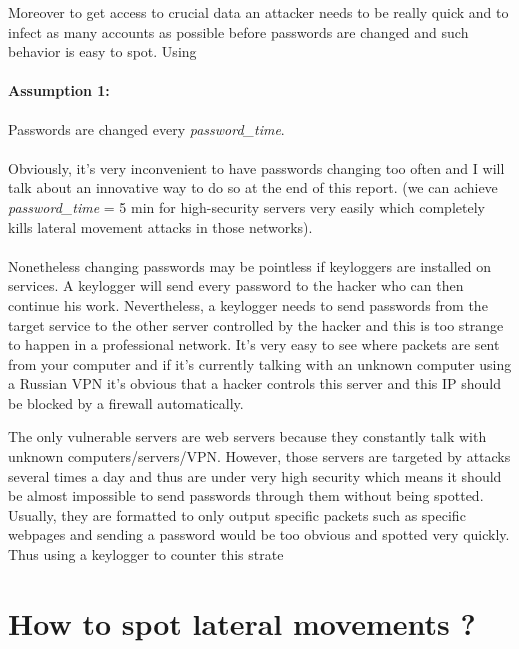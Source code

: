 \documentclass[11pt]{article}
\begin{document}
Moreover to get access to crucial data an attacker needs to be really quick and to infect as many accounts as possible before passwords are changed and such behavior is easy to spot. Using
\paragraph{Assumption 1:}
Passwords are changed every \textit{password\_time}.
\paragraph{}
Obviously, it's very inconvenient to have passwords changing too often and I will talk about an innovative way to do so at the end of this report. (we can achieve \textit{password\_time} = 5 min for high-security servers very easily which completely kills lateral movement attacks in those networks).\\
\paragraph{}
Nonetheless changing passwords may be pointless if keyloggers are installed on services. A keylogger will send every password to the hacker who can then continue his work. Nevertheless, a keylogger needs to send passwords from the target service to the other server controlled by the hacker and this is too strange to happen in a professional network. It's very easy to see where packets are sent from your computer and if it's currently talking with an unknown computer using a Russian VPN it's obvious that a hacker controls this server and this IP should be blocked by a firewall automatically.

The only vulnerable servers are web servers because they constantly talk with unknown computers/servers/VPN. However, those servers are targeted by attacks several times a day and thus are under very high security which means it should be almost impossible to send passwords through them without being spotted. Usually, they are formatted to only output specific packets such as specific webpages and sending a password would be too obvious and spotted very quickly. Thus using a keylogger to counter this strate

\section{How to spot lateral movements ?}
\end{document}
